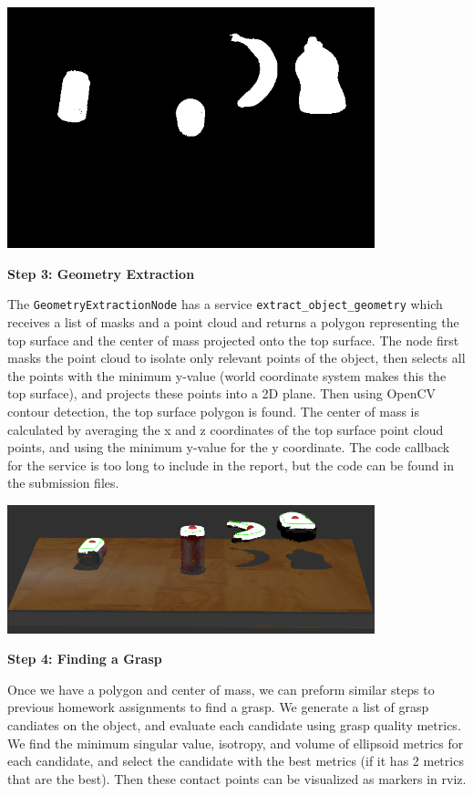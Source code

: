 \documentclass[12pt]{article}
\begin{document}
\begin{center}
	\includegraphics[width=0.8\textwidth]{masks.png}
\end{center}

\textbf{Step 3: Geometry Extraction}

The \texttt{GeometryExtractionNode} has a service \texttt{extract\_object\_geometry} which receives a list of masks and a point cloud and returns a polygon representing the top surface and the center of mass projected onto the top surface. The node first masks the point cloud to isolate only relevant points of the object, then selects all the points with the minimum y-value (world coordinate system makes this the top surface), and projects these points into a 2D plane. Then using OpenCV contour detection, the top surface polygon is found. The center of mass is calculated by averaging the x and z coordinates of the top surface point cloud points, and using the minimum y-value for the y coordinate. The code callback for the service is too long to include in the report, but the code can be found in the submission files.

\begin{center}
	\includegraphics[width=0.8\textwidth]{toppoints.png}
\end{center}

\textbf{Step 4: Finding a Grasp}

Once we have a polygon and center of mass, we can preform similar steps to previous homework assignments to find a grasp. We generate a list of grasp candiates on the object, and evaluate each candidate using grasp quality metrics. We find the minimum singular value, isotropy, and volume of ellipsoid metrics for each candidate, and select the candidate with the best metrics (if it has 2 metrics that are the best). Then these contact points can be visualized as markers in rviz.
\end{document}
